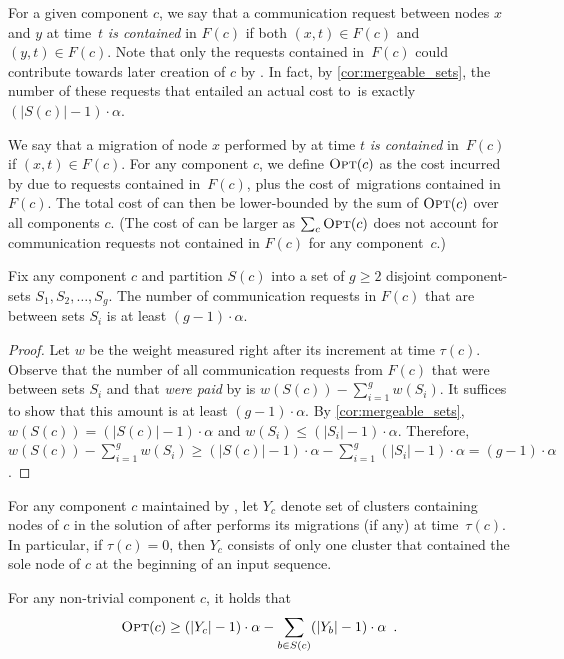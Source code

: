 For a given component $c$, we say that a communication request between nodes
$x$ and $y$ at time~$t$ \emph{is contained} in $F(c)$ if both $(x,t) \in F(c)$
and $(y,t) \in F(c)$. Note that only the requests contained in~$F(c)$
could contribute towards later creation of $c$ by \CREP. In fact, by
\ref{cor:mergeable_sets}, the number of these requests that
entailed an actual cost to~\CREP is exactly $(|S(c)| - 1) \cdot \alpha$.

We say that a migration of node $x$ performed by \OPT at time $t$ \emph{is
contained} in~$F(c)$ if $(x,t) \in F(c)$. For any component $c$, we define
$\textsc{Opt}(c)$ as the cost incurred by \OPT due to requests contained in~$F(c)$, 
plus the cost of~\OPT migrations contained in~$F(c)$. The total cost of \OPT
can then be lower-bounded by the sum of $\textsc{Opt}(c)$ over all components $c$.
(The cost of \OPT can be larger as $\sum_c \textsc{Opt}(c)$ does not account for 
communication requests not contained in $F(c)$ for any component~$c$.)

\begin{lemma}
\label{lem:merge_action_cut}
Fix any component $c$ and partition $S(c)$ into a set of $g \geq 2$ disjoint
component-sets $S_1, S_2, \ldots, S_g$. The number of communication requests
in $F(c)$ that are between sets $S_i$ is at least $(g-1) \cdot \alpha$.
\end{lemma}
\begin{proof}
Let $w$ be the weight measured right after its increment at time $\tau(c)$.
Observe that the number of all communication requests from $F(c)$ that were
between sets $S_i$ and that \emph{were paid} by \CREP is $w(S(c)) -
\sum_{i=1}^g w(S_i)$. It suffices to show that this amount is at least $(g-1)
\cdot \alpha$. By \ref{cor:mergeable_sets}, $w(S(c)) = (|S(c)|-1)
\cdot \alpha$ and $w(S_i) \leq (|S_i|-1) \cdot \alpha$. Therefore, $w(S(c)) -
\sum_{i=1}^g w(S_i) \geq (|S(c)|-1) \cdot \alpha - \sum_{i=1}^g (|S_i|-1)
\cdot \alpha = (g-1) \cdot \alpha$.
\end{proof}

For any component $c$ maintained by \CREP, let $Y_c$ denote set of clusters
containing nodes of $c$ in the solution of \OPT after \OPT performs its
migrations (if any) at time~$\tau(c)$. In particular, if $\tau(c) = 0$, then
$Y_c$ consists of only one cluster that contained the sole node of $c$ 
at the beginning of an input sequence.

\begin{lemma}
\label{lem:opt_recursive_bound}
For any non-trivial component $c$, it holds that
$$\textsc{Opt}(c) \geq (|Y_c| - 1)\cdot \alpha - \sum_{b \in S(c)} (|Y_b| - 1) \cdot \alpha\enspace.$$
\end{lemma}

